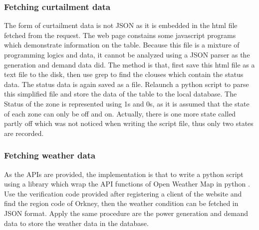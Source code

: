 \documentclass[12pt,a4paper]{report}
\begin{document}
                \subsubsection{Fetching curtailment data}
                \label{text_fetching_curtailment_data}
                The form of curtailment data is not JSON as it is embedded in the html file fetched from the request. The web page constains some javascript programs which demonstrate information
                on the table. Because this file is a mixture of programming logics and data, it cannot be analyzed using a JSON parser as the generation and demand data did. The method is that, first
                save this html file as a text file to the disk, then use grep \cite{website:grep} to find the clouses which contain the status data. The status data is again saved as a file. Relaunch
                a python script to parse this simplified file and store the data of the table to the local database. The Status of the zone is represented using 1s and 0s, as it is assumed that the state
                of each zone can only be off and on. Actually, there is one more state called partly off which was not noticed when writing the script file, thus only two states are recorded.

                \subsubsection{Fetching weather data}
                As the APIs are provided, the implementation is that to write a python script using a library which wrap the API functions of Open Weather Map in python \cite{website:pyowm}.
                Use the verification code provided after registering a client of the website and find the region code of Orkney, then the weather condition can be fetched in JSON format. Apply
                the same procedure are the power generation and demand data to store the weather data in the database.
\end{document}
